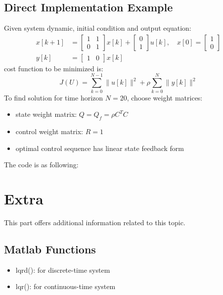 \documentclass[10pt,a4paper,oneside]{article}
\begin{document}
\subsection{Direct Implementation Example}
Given system dynamic, initial condition and output equation:
\begin{align*}
	x[k+1] &=\left[\begin{array}{ll}{1} & {1} \\ 
	{0} & {1}\end{array}\right] 
	x[k]+
	\left[\begin{array}{l}{0} \\ {1}\end{array}\right] 
	u[k], \quad x[0]=\left[\begin{array}{l}{1} \\ {0}\end{array}\right]\\
	y[k]&=\left[\begin{array}{ll}{1} & {0}\end{array}\right] x[k]
\end{align*}
cost function to be minimized is:
\[
J(U)=\sum_{k=0}^{N-1}\|u[k]\|^{2}+\rho \sum_{k=0}^{N}\|y[k]\|^{2}
\]
To find solution for time horizon $N=20$, choose weight matrices:
\begin{itemize}
	\item state weight matrix: $Q = Q_f = \rho C^T C$
	\item control weight matrix: $R=1$
	\item optimal control sequence has linear state feedback form
\end{itemize}
The code is as following:






\section{Extra}

This part offers additional information related to this topic.

\subsection{Matlab Functions}
\begin{itemize}
	\item lqrd(): for discrete-time system
	\item lqr(): for continuous-time system
\end{itemize}
\end{document}
